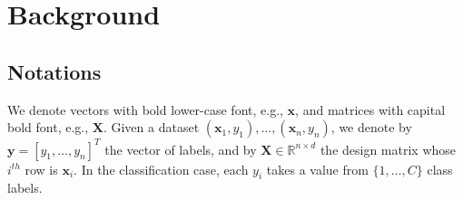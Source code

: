 \documentclass[preprint,11pt]{elsarticle}
\begin{document}









\section{Background}
\label{sec:2}
    \subsection{Notations}
    \label{sec:2.1}
        We denote vectors with bold lower-case font, e.g., $\boldsymbol{x}$, and matrices with capital bold font, e.g., $\bm{X}$. Given a dataset $(\boldsymbol{x}_1, y_1), \ldots, (\boldsymbol{x}_n, y_n)$, we denote by $\boldsymbol{y} = [y_1, \ldots, y_n]^T$ the vector of labels, and by $\bm{X} \in \mathbb{R}^{n \times d}$ the design matrix whose $i^{th}$ row is $\boldsymbol{x}_i$. In the classification case, each $y_i$ takes a value from $\{1, \ldots, C\}$ class labels.
\end{document}
